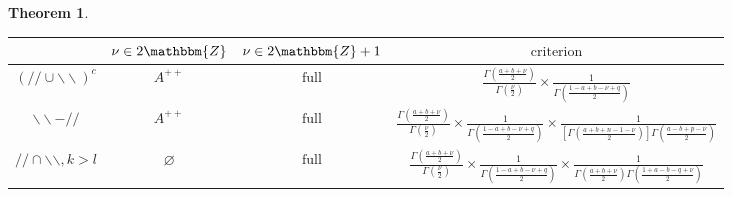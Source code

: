 \documentclass[12pt]{msjproc} %
\newcommand{\tmop}[1]{\ensuremath{\operatorname{#1}}}
\newtheorem{theorem}{Theorem}
\theoremstyle{definition}
\theoremstyle{exampstyle} \newtheorem{examp}[theorem]{Theorem}
\begin{document}
\begin{versiona}
\begin{theorem}
\begin{enumerate}
\begin{enumerate}
      \begin{center}
        \begin{center}
          \begin{tabular}{|c|c|c|c|}
            \hline
            & $\nu \in 2\mathbbm{Z}$ & $\nu \in 2\mathbbm{Z}+ 1$ &
            $\tmop{criterion}$\\
            \hline
            $(/ / \cup \backslash\backslash)^c$ & $A^{+ +}$ & $\tmop{full}$ &
            $\frac{\Gamma \left( \frac{a + b + \nu}{2} \right)}{\Gamma \left(
            \frac{\nu}{2} \right)} \times \frac{1}{\Gamma \left( \frac{1 - a +
            b - \nu + q}{2} \right)}$\\
            \hline
            $\backslash\backslash - / /$ & $A^{+ +}$ & $\tmop{full}$ &
            $\frac{\Gamma \left( \frac{a + b + \nu}{2} \right)}{\Gamma \left(
            \frac{\nu}{2} \right)} \times \frac{1}{\Gamma \left( \frac{1 - a +
            b - \nu + q}{2} \right)} \times \frac{1}{\left[ \Gamma \left(
            \frac{a + b + n - 1 - \nu}{2} \right) \right] \Gamma \left(
            \frac{a - b + p - \nu}{2} \right)}$\\
            \hline
            $/ / \cap \backslash\backslash, k > l$ & $\varnothing$ &
            $\tmop{full}$ & $\frac{\Gamma \left( \frac{a + b + \nu}{2}
            \right)}{\Gamma \left( \frac{\nu}{2} \right)} \times
            \frac{1}{\Gamma \left( \frac{1 - a + b - \nu + q}{2} \right)}
            \times \frac{1}{\Gamma \left( \frac{a + b + \nu}{2} \right) \Gamma
            \left( \frac{1 + a - b - q + \nu}{2} \right)}$\\
            \hline
          \end{tabular}
        \end{center}
      \end{center}
      

\end{enumerate}
\end{enumerate}
\end{theorem}
\end{versiona}
\end{document}
